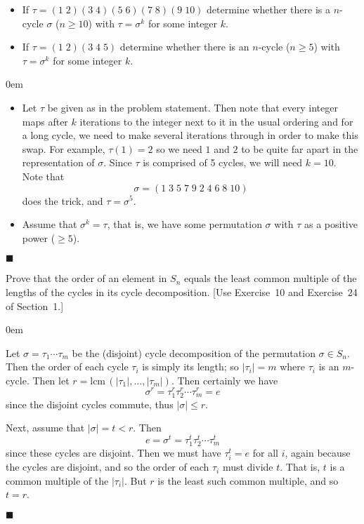 \documentclass[12pt]{article}
\renewcommand{\qed}{\hfill$\blacksquare$}
\renewenvironment{proof}{\begin{addmargin}[1em]{0em}\begin{newproof}}{\end{newproof}\end{addmargin}\qed}
\newenvironment{problem}[2][Exercise]{\begin{trivlist}
\item[\hskip \labelsep {\bfseries #1}\hskip \labelsep {\bfseries #2.}]}{\end{trivlist}}
\begin{document}
\begin{problem}{1.3.12}
\begin{itemize}
  \item If $\tau = \left(1\;2\right)\left(3\;4\right)\left(5\;6\right)\left(7\;8\right)\left(9\;10\right) $ determine whether there is a $n$-cycle $\sigma$ ($n\geq 10$) with $\tau = \sigma^k$ for some integer $k$.
  \item If $\tau=\left(1\;2\right)\left(3\;4\;5\right)$ determine whether there is an $n$-cycle ($n\geq 5$) with $\tau=\sigma^k$ for some integer $k$.
\end{itemize}
\end{problem}
\begin{proof}
\begin{itemize}
  \item Let $\tau$ be given as in the problem statement. Then note that every integer maps after $k$ iterations to the integer next to it in the usual ordering and for a long cycle, we need to make several iterations through in order to make this swap. For example, $\tau\left(1\right)=2$ so we need $1$ and $2$ to be quite far apart in the representation of $\sigma$. Since $\tau$ is comprised of 5 cycles, we will need $k=10$. Note that
  $$ \sigma = \left(1\;3\;5\;7\;9\;2\;4\;6\;8\;10\right) $$ does the trick, and $\tau = \sigma^5$.
  \item Assume that $\sigma^k=\tau$, that is, we have some permutation $\sigma$ with $\tau$ as a positive power ($\geq 5$).
\end{itemize}
\end{proof}





\begin{problem}{1.3.15}
Prove that the order of an element in $S_n$ equals the least common multiple of the lengths of the cycles in its cycle decomposition. [Use Exercise~10 and Exercise~24 of Section~1.]
\end{problem}
\begin{proof}
Let $\sigma = \tau_1 \cdots \tau_m$ be the (disjoint) cycle decomposition of the permutation $\sigma \in S_n$. Then the order of each cycle $\tau_i$ is simply its length; so $\left|\tau_i\right|=m$ where $\tau_i$ is an $m$-cycle. Then let $r = \text{lcm}\,\left(\left|\tau_1\right|,\ldots,\left|\tau_m\right|\right)$. Then certainly we have \[ \sigma^r = \tau_1^r \tau_2^r \cdots \tau_m^r =e \] since the disjoint cycles commute, thus $\left|\sigma\right| \leq r$.

Next, assume that $\left|\sigma \right| = t < r$. Then \[ e = \sigma^t = \tau_1^t \tau_2^t \cdots \tau_m^t \] since these cycles are disjoint. Then we must have $\tau_i^t = e$ for all $i$, again because the cycles are disjoint, and so the order of each $\tau_i$ must divide $t$. That is, $t$ is a common multiple of the $\left|\tau_i\right|$. But $r$ is the least such common multiple, and so $t=r$.
\end{proof}
\end{document}
